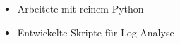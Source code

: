 \begin{itemize}
	\item Arbeitete mit reinem Python
    \item Entwickelte Skripte f\"ur Log-Analyse
\end{itemize}
